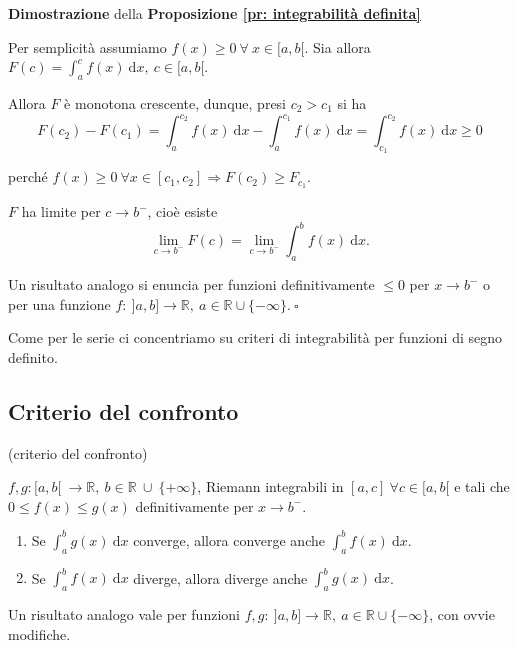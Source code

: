 \begin{dembar}
	\textbf{Dimostrazione} della \textbf{Proposizione \ref{pr: integrabilità definita}}
	
	
	Per semplicità assumiamo $f(x) \geq 0 \ \forall \ x \in [a,b[$. Sia allora $F(c)=\int_{a}^{c} f(x) \ \mathrm{d}x, \ c \in [a,b[$. 
	
	Allora $F$ è monotona crescente, dunque, presi $c_2 > c_1$ si ha
	\begin{equation*}
		F(c_2) - F(c_1) = \int_{a}^{c_2} f(x) \ \mathrm{d}x - \int_{a}^{c_1} f(x) \ \mathrm{d}x = \int_{c_1}^{c_2} f(x) \ \mathrm{d}x \geq 0
	\end{equation*}
	
	perché $f(x) \geq 0 \ \forall x \in [c_1,c_2] \Rightarrow F(c_2) \geq F_{c_1}$.
	
	$F$ ha limite per $c \rightarrow b^-$, cioè esiste
	\begin{equation*}
		\lim_{c \rightarrow b^-} F(c) = \lim_{c \rightarrow b^-} \int_{a}^{b} f(x) \ \mathrm{d}x.
	\end{equation*}
	
	Un risultato analogo si enuncia per funzioni definitivamente $\leq 0$ per $ x \rightarrow b^-$ o per una funzione $f: \ ]a,b] \rightarrow \mathbb{R}, \ a \in \mathbb{R} \cup \{-\infty\}. \ \square$ 
\end{dembar}


Come per le serie ci concentriamo su criteri di integrabilità per funzioni di segno definito.

\subsection{Criterio del confronto}
\begin{theorem} (criterio del confronto)
	
\end{theorem}
	\label{th:criterio del confronto integrale}
	$f,g : [a,b[ \ \rightarrow \mathbb{R}, \ b \in \mathbb{R} \ \cup \ \{+\infty\}$, Riemann integrabili in $[a,c] \ \forall c \in [a,b[$ e tali che \\ %
	$0 \leq f(x) \leq g(x)$ definitivamente per $x \rightarrow b^-$.
	\begin{enumerate}
		\item Se $\int_{a}^{b} g(x) \ \mathrm{d}x$ converge, allora converge anche $\int_{a}^{b} f(x) \ \mathrm{d}x$.
		\item Se $\int_{a}^{b} f(x) \ \mathrm{d}x$ diverge, allora diverge anche $\int_{a}^{b} g(x) \ \mathrm{d}x$.
	\end{enumerate}
	Un risultato analogo vale per funzioni $f,g: \ ]a,b] \rightarrow \mathbb{R}, \ a \in \mathbb{R} \cup \{-\infty\}$, con ovvie modifiche.


